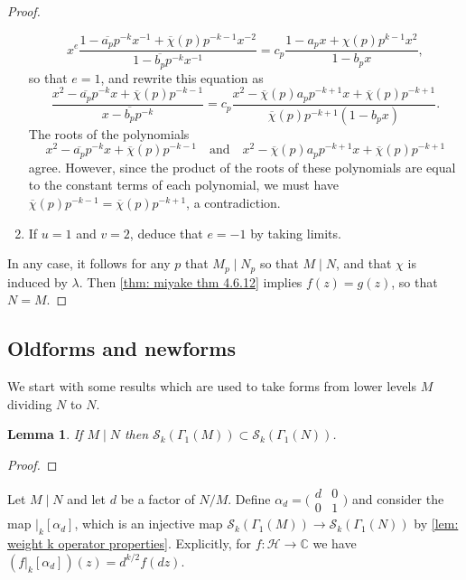 \documentclass[10pt,leqno,twoside]{article}
\theoremstyle{plain}
\newtheorem{lemma}[lem]{Lemma}
\theoremstyle{definition}
\numberwithin{equation}{section}
\numberwithin{lem}{section}
\newcommand{\textib}[1]{\textbf{\textit{#1\index{#1}}}} %
\newcommand{\tbd}{{\Huge\color{red}{\textib{TO DO}}}}
\newcommand{\sai}[1]{\textcolor{red}{#1}}
\begin{document}
\begin{proof}
\begin{enumerate}[label=(\arabic*)]
        \[x^e\frac{1-\overline{a_p}p^{-k}x^{-1} + \overline{\chi}(p)p^{-k-1}x^{-2}}{1-\overline{b_p}p^{-k}x^{-1}} = c_p\frac{1-a_px + \chi(p)p^{k-1}x^2}{1-b_px},\] so that $e = 1$, and rewrite this equation as 
        \[\frac{x^2-\overline{a_p}p^{-k}x + \overline \chi(p)p^{-k-1}}{x-\overline{b_p}p^{-k}} = c_p\frac{x^2-\overline\chi(p)a_pp^{-k+1}x + \overline\chi(p)p^{-k+1}}{\overline\chi(p)p^{-k+1}(1-b_px)}.\] The roots of the polynomials 
        \[x^2-\overline{a_p}p^{-k}x + \overline \chi(p)p^{-k-1}\quad \text{and}\quad x^2-\overline\chi(p)a_pp^{-k+1}x + \overline\chi(p)p^{-k+1}\] agree. However, since the product of the roots of these polynomials are equal to the constant terms of each polynomial, we must have $\overline \chi(p)p^{-k-1} = \overline\chi(p)p^{-k+1}$, a contradiction. 
        
        \item If $u = 1$ and $v = 2$, deduce that $e = -1$ by taking limits.
    \end{enumerate}
    In any case, it follows for any $p$ that $M_p\mid N_p$ so that $M\mid N$, and that $\chi$ is induced by $\lambda$. Then \cref{thm: miyake thm 4.6.12} implies $f(z) = g(z)$, so that $N = M$.
\end{proof}

\subsection{Oldforms and newforms}
We start with some results which are used to take forms from lower levels $M$ dividing $N$ to $N$.
\begin{lemma}
    If $M\mid N$ then $\mathcal S_k(\varGamma_1(M))\subset \mathcal S_k(\varGamma_1(N))$.
\end{lemma}
\begin{proof}
    \tbd
\end{proof}
Let $M\mid N$ and let $d$ be a factor of $N/M$. Define $\alpha_d = \big(\!\begin{smallmatrix}
    d & 0 \\ 0 & 1
\end{smallmatrix}\!\big)$ and consider the map $|_k[\alpha_d]$, which is an injective map $\mathcal S_k(\varGamma_1(M))\to\mathcal S_k(\varGamma_1(N))$ by \cref{lem: weight k operator properties}. Explicitly, for $f\colon\mathcal H\to\mathbb C$ we have $(f|_k[\alpha_d])(z) = d^{k/2}f(dz)$.
\end{document}
